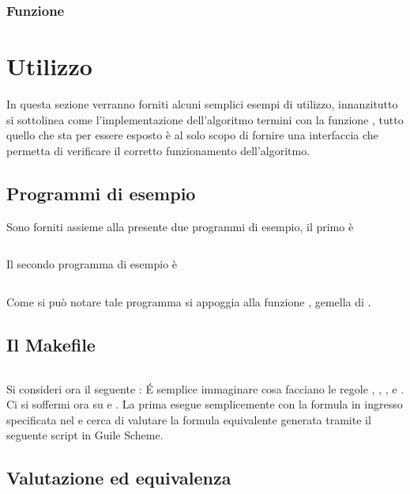 \documentclass[11pt,letterpaper,twoside]{article}
\begin{document}
\subsubsection{Funzione } 

\newpage
\section{Utilizzo}

In questa sezione verranno forniti alcuni semplici esempi di utilizzo,
innanzitutto si sottolinea come l'implementazione dell'algoritmo termini con la
funzione , tutto quello che sta per essere esposto è al solo
scopo di fornire una interfaccia che permetta di verificare il corretto
funzionamento dell'algoritmo.

\subsection{Programmi di esempio}
Sono forniti assieme alla presente due programmi di esempio, il primo è

\inputminted[linenos, mathescape=true]{C}{../test.c}

Il secondo programma di esempio è 

\inputminted[linenos, mathescape=true]{C}{../test2.c}

Come si può notare tale programma si appoggia alla funzione ,
gemella di .


\subsection{Il Makefile} \inputminted[linenos]{makefile}{../makefile}
Si consideri ora il seguente :
\'E semplice immaginare cosa facciano le regole , , ,
 e . Ci si soffermi ora su  e
. La prima esegue semplicemente  con la formula in
ingresso specificata nel  e cerca di valutare la formula
equivalente generata tramite il seguente script in Guile Scheme\autocite{guile}.

\subsection{Valutazione ed equivalenza}
\inputminted[linenos]{scheme}{../eval.scm}
\end{document}

